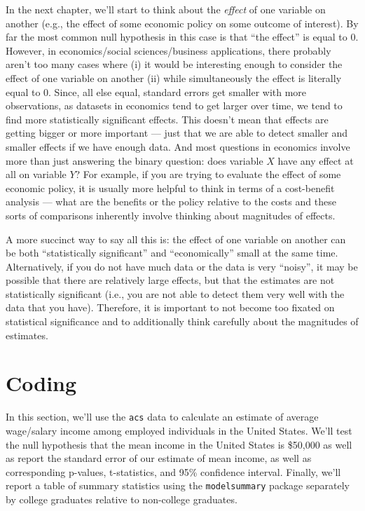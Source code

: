 \documentclass[
  letterpaper,
  DIV=11,
  numbers=noendperiod]{scrreprt}
\begin{document}
In the next chapter, we'll start to think about the \emph{effect} of one
variable on another (e.g., the effect of some economic policy on some
outcome of interest). By far the most common null hypothesis in this
case is that ``the effect'' is equal to 0. However, in economics/social
sciences/business applications, there probably aren't too many cases
where (i) it would be interesting enough to consider the effect of one
variable on another (ii) while simultaneously the effect is literally
equal to 0. Since, all else equal, standard errors get smaller with more
observations, as datasets in economics tend to get larger over time, we
tend to find more statistically significant effects. This doesn't mean
that effects are getting bigger or more important --- just that we are
able to detect smaller and smaller effects if we have enough data. And
most questions in economics involve more than just answering the binary
question: does variable \(X\) have any effect at all on variable \(Y\)?
For example, if you are trying to evaluate the effect of some economic
policy, it is usually more helpful to think in terms of a cost-benefit
analysis --- what are the benefits or the policy relative to the costs
and these sorts of comparisons inherently involve thinking about
magnitudes of effects.

A more succinct way to say all this is: the effect of one variable on
another can be both ``statistically significant'' and ``economically''
small at the same time. Alternatively, if you do not have much data or
the data is very ``noisy'', it may be possible that there are relatively
large effects, but that the estimates are not statistically significant
(i.e., you are not able to detect them very well with the data that you
have). Therefore, it is important to not become too fixated on
statistical significance and to additionally think carefully about the
magnitudes of estimates.

\section{Coding}\label{coding-1}

In this section, we'll use the \texttt{acs} data to calculate an
estimate of average wage/salary income among employed individuals in the
United States. We'll test the null hypothesis that the mean income in
the United States is \$50,000 as well as report the standard error of
our estimate of mean income, as well as corresponding p-values,
t-statistics, and 95\% confidence interval. Finally, we'll report a
table of summary statistics using the \texttt{modelsummary} package
separately by college graduates relative to non-college graduates.
\end{document}
